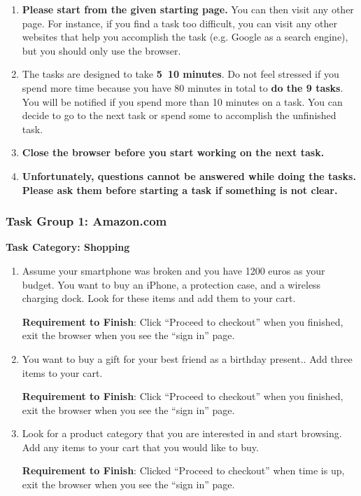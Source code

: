 \begin{enumerate}
    \item \textbf{Please start from the given starting page.} You can then visit any other page. 
          For instance, if you find a task too difficult, you can visit any other websites 
          that help you accomplish the task (e.g. Google as a search engine), but you 
          should only use the browser.
    \item The tasks are designed to take \textbf{5~10 minutes}. Do not feel stressed if you spend 
          more time because you have 80 minutes in total to \textbf{do the 9 tasks}. You will 
          be notified if you spend more than 10 minutes on a task. You can decide to go to 
          the next task or spend some to accomplish the unfinished task. 
    \item \textbf{Close the browser before you start working on the next task.}
    \item \textbf{Unfortunately, questions cannot be answered while doing the tasks.
          Please ask them before starting a task if something is not clear. }
\end{enumerate}

\subsubsection{Task Group 1: Amazon.com}

\textbf{Task Category: Shopping}

\begin{enumerate}
    \item Assume your smartphone was broken and you have 1200 euros 
          as your budget. You want to buy an iPhone, a protection case, and a wireless 
          charging dock. Look for these items and add them to your cart.

          \textbf{Requirement to Finish}: Click ``Proceed to checkout'' when you finished, exit the browser when you see the ``sign in'' page.
    \item You want to buy a gift for your best friend as a birthday present.. Add three items to your cart.
    
          \textbf{Requirement to Finish}: Click ``Proceed to checkout'' when you finished, exit the browser when you see the ``sign in'' page.
    \item Look for a product category that you are interested in and start browsing. Add any items to your cart that you would like to buy. 
           
          \textbf{Requirement to Finish}: Clicked ``Proceed to checkout'' when time is up, exit the browser when you see the ``sign in'' page.
\end{enumerate}

